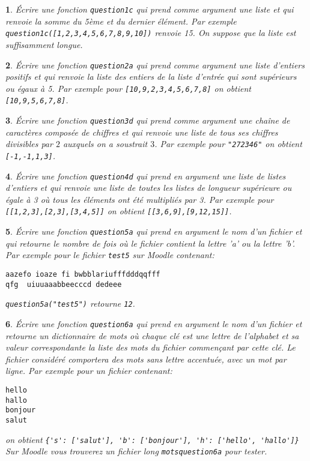 \documentclass[10pt]{article}
\newtheorem{exi}{}
\newenvironment{exo}{\begin{exi}\em}{\end{exi}}
\begin{document}
\begin{exo}
    Écrire une fonction {\tt question1c} qui prend comme argument une liste et
qui renvoie la somme du 5ème et du dernier élément. Par exemple
\verb+question1c([1,2,3,4,5,6,7,8,9,10])+ renvoie 15.
On suppose que la liste est suffisamment longue.
\end{exo}
\vspace*{-2ex}
\begin{exo}
    Écrire une fonction {\tt question2a} qui prend comme argument une liste d'entiers positifs et qui renvoie la liste des entiers de la liste d'entrée qui sont
supérieurs ou égaux à 5. Par exemple pour \verb+[10,9,2,3,4,5,6,7,8]+
on obtient \verb+[10,9,5,6,7,8]+.
\end{exo}
\vspace*{-2ex}
\begin{exo}
    Écrire une fonction {\tt question3d} qui prend comme argument une chaîne de
caractères composée de chiffres
et qui renvoie une liste de tous ses chiffres divisibles par $2$
auxquels on a soustrait $3$. Par
exemple pour \verb+"272346"+ on obtient \verb+[-1,-1,1,3]+.
\end{exo}
\vspace*{-2ex}
\begin{exo}
    Écrire une fonction {\tt question4d} qui prend en argument une liste de listes d'entiers et qui renvoie une liste de toutes les listes
de longueur supérieure ou égale à 3 où tous les éléments ont été multipliés par 3. Par exemple pour \verb+[[1,2,3],[2,3],[3,4,5]]+ on obtient \verb+[[3,6,9],[9,12,15]]+.
\end{exo}
\vspace*{-2ex}
\begin{exo}
    Écrire une fonction {\tt question5a} qui prend en argument le nom d'un fichier et qui retourne le nombre de fois où le fichier contient la lettre 'a' ou la
lettre 'b'.
Par exemple pour le fichier \verb+test5+ sur Moodle contenant: 
\begin{verbatim} 
aazefo ioaze fi bwbblariufffdddqqfff
qfg  uiuuaaabbeecccd dedeee
\end{verbatim} 
\verb+question5a("test5")+ retourne \verb+12+.
\end{exo}
\vspace*{-2ex}
\begin{exo}
    Écrire une fonction \verb+question6a+ qui prend en argument le nom d'un fichier
et retourne un dictionnaire de mots où chaque clé est une lettre de
l'alphabet et sa valeur correspondante la liste des mots du fichier commençant
par cette clé. Le fichier considéré comportera des mots 
sans lettre accentuée, avec un mot par ligne. Par exemple pour un fichier
contenant:
\begin{verbatim}
hello
hallo
bonjour
salut
\end{verbatim}
on obtient \verb+{'s': ['salut'], 'b': ['bonjour'], 'h': ['hello', 'hallo']}+\\
Sur Moodle vous trouverez un fichier long \verb+motsquestion6a+ pour tester.
\end{exo}
\end{document}
